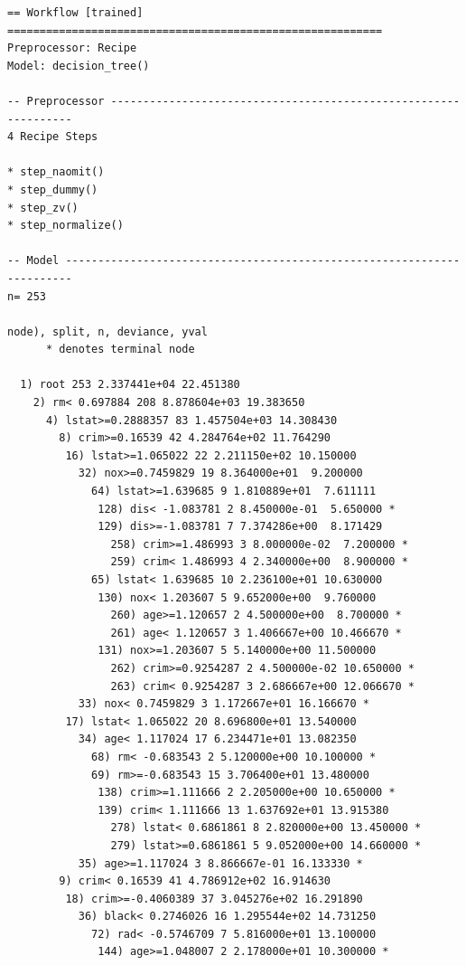 \documentclass[
]{article}
\begin{document}
\begin{verbatim}
== Workflow [trained] ==========================================================
Preprocessor: Recipe
Model: decision_tree()

-- Preprocessor ----------------------------------------------------------------
4 Recipe Steps

* step_naomit()
* step_dummy()
* step_zv()
* step_normalize()

-- Model -----------------------------------------------------------------------
n= 253 

node), split, n, deviance, yval
      * denotes terminal node

  1) root 253 2.337441e+04 22.451380  
    2) rm< 0.697884 208 8.878604e+03 19.383650  
      4) lstat>=0.2888357 83 1.457504e+03 14.308430  
        8) crim>=0.16539 42 4.284764e+02 11.764290  
         16) lstat>=1.065022 22 2.211150e+02 10.150000  
           32) nox>=0.7459829 19 8.364000e+01  9.200000  
             64) lstat>=1.639685 9 1.810889e+01  7.611111  
              128) dis< -1.083781 2 8.450000e-01  5.650000 *
              129) dis>=-1.083781 7 7.374286e+00  8.171429  
                258) crim>=1.486993 3 8.000000e-02  7.200000 *
                259) crim< 1.486993 4 2.340000e+00  8.900000 *
             65) lstat< 1.639685 10 2.236100e+01 10.630000  
              130) nox< 1.203607 5 9.652000e+00  9.760000  
                260) age>=1.120657 2 4.500000e+00  8.700000 *
                261) age< 1.120657 3 1.406667e+00 10.466670 *
              131) nox>=1.203607 5 5.140000e+00 11.500000  
                262) crim>=0.9254287 2 4.500000e-02 10.650000 *
                263) crim< 0.9254287 3 2.686667e+00 12.066670 *
           33) nox< 0.7459829 3 1.172667e+01 16.166670 *
         17) lstat< 1.065022 20 8.696800e+01 13.540000  
           34) age< 1.117024 17 6.234471e+01 13.082350  
             68) rm< -0.683543 2 5.120000e+00 10.100000 *
             69) rm>=-0.683543 15 3.706400e+01 13.480000  
              138) crim>=1.111666 2 2.205000e+00 10.650000 *
              139) crim< 1.111666 13 1.637692e+01 13.915380  
                278) lstat< 0.6861861 8 2.820000e+00 13.450000 *
                279) lstat>=0.6861861 5 9.052000e+00 14.660000 *
           35) age>=1.117024 3 8.866667e-01 16.133330 *
        9) crim< 0.16539 41 4.786912e+02 16.914630  
         18) crim>=-0.4060389 37 3.045276e+02 16.291890  
           36) black< 0.2746026 16 1.295544e+02 14.731250  
             72) rad< -0.5746709 7 5.816000e+01 13.100000  
              144) age>=1.048007 2 2.178000e+01 10.300000 *

\end{verbatim}
\end{document}
